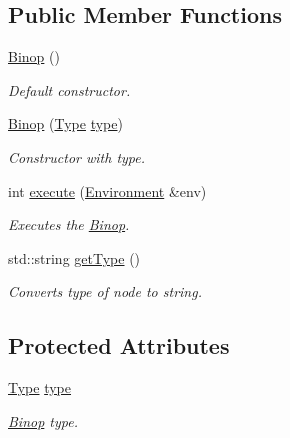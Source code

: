 \subsection*{Public Member Functions}
\begin{DoxyCompactItemize}
\item 
\hypertarget{classBinop_a18bd9729a042a045df7fe11ffe068707}{}\hyperlink{classBinop_a18bd9729a042a045df7fe11ffe068707}{Binop} ()\label{classBinop_a18bd9729a042a045df7fe11ffe068707}

\begin{DoxyCompactList}\small\item\em Default constructor. \end{DoxyCompactList}\item 
\hyperlink{classBinop_a3d538d66e8aa1ac46feb5e984fbfb8c9}{Binop} (\hyperlink{classBinop_a833e85c431d85ca69758bfebec9193dc}{Type} \hyperlink{classBinop_a6ba1f508e1122caea1ef9350fee74396}{type})
\begin{DoxyCompactList}\small\item\em Constructor with type. \end{DoxyCompactList}\item 
int \hyperlink{classBinop_ac905eda0640f64cd28ed5c65b4c0c125}{execute} (\hyperlink{classEnvironment}{Environment} \&env)
\begin{DoxyCompactList}\small\item\em Executes the \hyperlink{classBinop}{Binop}. \end{DoxyCompactList}\item 
std\+::string \hyperlink{classBinop_a25a4913ef0d2ec9787df24c391734094}{get\+Type} ()
\begin{DoxyCompactList}\small\item\em Converts type of node to string. \end{DoxyCompactList}\end{DoxyCompactItemize}
\subsection*{Protected Attributes}
\begin{DoxyCompactItemize}
\item 
\hypertarget{classBinop_a6ba1f508e1122caea1ef9350fee74396}{}\hyperlink{classBinop_a833e85c431d85ca69758bfebec9193dc}{Type} \hyperlink{classBinop_a6ba1f508e1122caea1ef9350fee74396}{type}\label{classBinop_a6ba1f508e1122caea1ef9350fee74396}

\begin{DoxyCompactList}\small\item\em \hyperlink{classBinop}{Binop} type. \end{DoxyCompactList}\end{DoxyCompactItemize}


